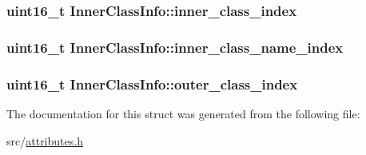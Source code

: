 \subsubsection[{\texorpdfstring{inner\+\_\+class\+\_\+index}{inner_class_index}}]{\setlength{\rightskip}{0pt plus 5cm}uint16\+\_\+t Inner\+Class\+Info\+::inner\+\_\+class\+\_\+index}\hypertarget{structInnerClassInfo_a3383bc5bea2999b6bd91b9dfc095264f}{}\label{structInnerClassInfo_a3383bc5bea2999b6bd91b9dfc095264f}
\subsubsection[{\texorpdfstring{inner\+\_\+class\+\_\+name\+\_\+index}{inner_class_name_index}}]{\setlength{\rightskip}{0pt plus 5cm}uint16\+\_\+t Inner\+Class\+Info\+::inner\+\_\+class\+\_\+name\+\_\+index}\hypertarget{structInnerClassInfo_a6d008047cb2df8aa856666169f625026}{}\label{structInnerClassInfo_a6d008047cb2df8aa856666169f625026}
\subsubsection[{\texorpdfstring{outer\+\_\+class\+\_\+index}{outer_class_index}}]{\setlength{\rightskip}{0pt plus 5cm}uint16\+\_\+t Inner\+Class\+Info\+::outer\+\_\+class\+\_\+index}\hypertarget{structInnerClassInfo_a8449c27dc3cac6e437f4e1c1132ea229}{}\label{structInnerClassInfo_a8449c27dc3cac6e437f4e1c1132ea229}


The documentation for this struct was generated from the following file\+:\begin{DoxyCompactItemize}
\item 
src/\hyperlink{attributes_8h}{attributes.\+h}\end{DoxyCompactItemize}
